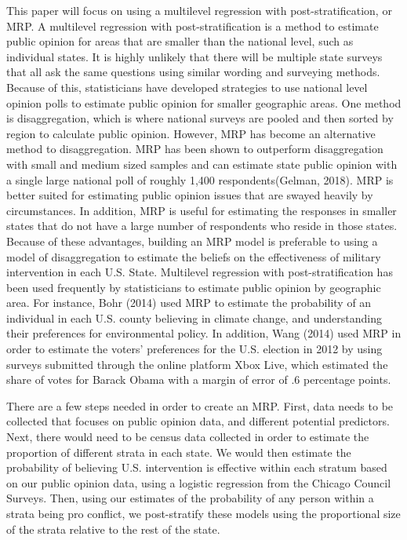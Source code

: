 \documentclass[
  11pt,
]{article}
\begin{document}
This paper will focus on using a multilevel regression with
post-stratification, or MRP. A multilevel regression with
post-stratification is a method to estimate public opinion for areas
that are smaller than the national level, such as individual states. It
is highly unlikely that there will be multiple state surveys that all
ask the same questions using similar wording and surveying methods.
Because of this, statisticians have developed strategies to use national
level opinion polls to estimate public opinion for smaller geographic
areas. One method is disaggregation, which is where national surveys are
pooled and then sorted by region to calculate public opinion. However,
MRP has become an alternative method to disaggregation. MRP has been
shown to outperform disaggregation with small and medium sized samples
and can estimate state public opinion with a single large national poll
of roughly 1,400 respondents(Gelman, 2018). MRP is better suited for
estimating public opinion issues that are swayed heavily by
circumstances. In addition, MRP is useful for estimating the responses
in smaller states that do not have a large number of respondents who
reside in those states. Because of these advantages, building an MRP
model is preferable to using a model of disaggregation to estimate the
beliefs on the effectiveness of military intervention in each U.S.
State. Multilevel regression with post-stratification has been used
frequently by statisticians to estimate public opinion by geographic
area. For instance, Bohr (2014) used MRP to estimate the probability of
an individual in each U.S. county believing in climate change, and
understanding their preferences for environmental policy. In addition,
Wang (2014) used MRP in order to estimate the voters' preferences for
the U.S. election in 2012 by using surveys submitted through the online
platform Xbox Live, which estimated the share of votes for Barack Obama
with a margin of error of .6 percentage points.

There are a few steps needed in order to create an MRP. First, data
needs to be collected that focuses on public opinion data, and different
potential predictors. Next, there would need to be census data collected
in order to estimate the proportion of different strata in each state.
We would then estimate the probability of believing U.S. intervention is
effective within each stratum based on our public opinion data, using a
logistic regression from the Chicago Council Surveys. Then, using our
estimates of the probability of any person within a strata being pro
conflict, we post-stratify these models using the proportional size of
the strata relative to the rest of the state.
\end{document}
